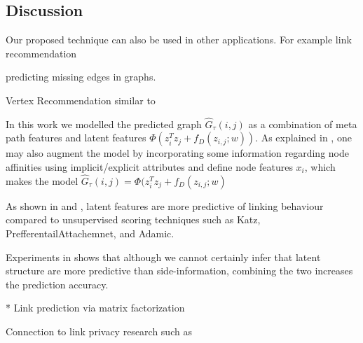 
\subsection{Discussion}



Our proposed technique can also be used in other applications. For example link recommendation 


predicting missing edges in graphs.

Vertex Recommendation similar to \cite{ou2016asymmetric} 


In this work we modelled the predicted graph $ \hat{G}_\tau(i,j)$ as a combination of meta path features and latent features $\Phi(z_{i}^Tz_{j} + f_D(z_{i,j};w))$. As explained in \cite{*}, one may also augment the model by incorporating some information regarding node affinities using implicit/explicit attributes and define node features $x_i$, which makes the model $\hat{G}_\tau(i,j) = \Phi(z_{i}^Tz_{j} + f_D(z_{i,j};w)$

As shown in \cite{*} and \cite{Zhu2016}, latent features are more predictive of linking behaviour compared to unsupervised scoring techniques such as Katz, PrefferentailAttachemnet, and Adamic.

Experiments in \cite{*} shows that although we cannot certainly infer that latent structure are more predictive than side-information, combining the two increases the prediction accuracy.

* Link prediction via matrix factorization

Connection to link privacy research such as \cite{amin:wwwj}


